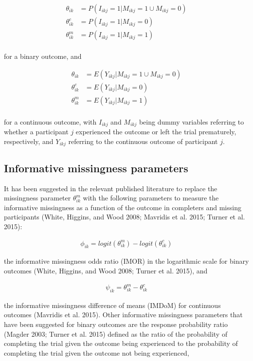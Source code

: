 \[\begin{aligned}
\theta_{ik} &= P(I_{ikj} = 1 | M_{ikj} = 1 \cup M_{ikj} = 0) \\
\theta^{c}_{ik} &= P(I_{ikj} = 1 | M_{ikj} = 0) \\
\theta^{m}_{ik} &= P(I_{ikj} = 1 | M_{ikj} = 1) \\
\end{aligned}\]

for a binary outcome, and

\[\begin{aligned}
\theta_{ik} &= E(Y_{ikj} | M_{ikj} = 1 \cup M_{ikj} = 0) \\
\theta^{c}_{ik} &= E(Y_{ikj} | M_{ikj} = 0) \\
\theta^{m}_{ik} &= E(Y_{ikj} | M_{ikj} = 1) \\
\end{aligned}\]

for a continuous outcome, with \(I_{ikj}\) and \(M_{ikj}\) being dummy variables
referring to whether a participant \(j\) experienced the outcome or left the trial
prematurely, respectively, and \(Y_{ikj}\) referring to the continuous outcome of
participant \(j\).

\hypertarget{informative-missingness-parameters}{%
\subsection{Informative missingness parameters}\label{informative-missingness-parameters}}

It has been suggested in the relevant published literature to replace the missingness
parameter \(\theta^{m}_{ik}\) with the following parameters to measure the informative
missingness as a function of the outcome in completers and missing participants
(White, Higgins, and Wood 2008; Mavridis et al. 2015; Turner et al. 2015):

\[\begin{aligned}
\phi_{ik} = logit(\theta^{m}_{ik}) - logit(\theta^{c}_{ik})
\end{aligned}\]

the informative missingness odds ratio (IMOR) in the logarithmic scale for binary
outcomes (White, Higgins, and Wood 2008; Turner et al. 2015), and

\[\begin{aligned}
\psi_{ik} = \theta^{m}_{ik} - \theta^{c}_{ik}
\end{aligned}\]

the informative missingness difference of means (IMDoM) for continuous outcomes
(Mavridis et al. 2015). Other informative missingness parameters that have been suggested
for binary outcomes are the response probability ratio (Magder 2003; Turner et al. 2015)
defined as the ratio of the probability of completing the trial given the outcome
being experienced to the probability of completing the trial given the outcome
not being experienced,

